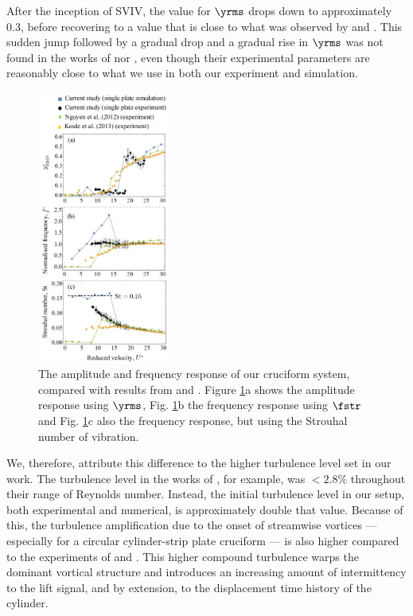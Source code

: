 \documentclass[a4paper,fleqn]{cas-sc}
\begin{document}
After the inception of SVIV, the value for  $\yrms$ drops down to approximately 0.3, before recovering to a value that is close to what was observed by \citet{Nguyen2012} and \citet{Koide2013}. This sudden jump followed by a gradual drop and a gradual rise in  $\yrms$ was not found in the works of \citet{Nguyen2012} nor \citet{Koide2013}, even though their experimental parameters are reasonably close to what we use in both our experiment and simulation.


\begin{figure}
  \centering
  \includegraphics[width=0.4\textwidth]{figs/figure10}
  \caption{The amplitude and frequency response of our cruciform system, compared with results from \citet{Nguyen2012} and \citet{Koide2013}. Figure \ref{fig:ampFreqComp}a shows the amplitude response using $\yrms$, Fig. \ref{fig:ampFreqComp}b the frequency response using $\fstr$ and Fig. \ref{fig:ampFreqComp}c also the frequency response, but using the Strouhal number of vibration.} \label{fig:ampFreqComp}
\end{figure}

We, therefore, attribute this difference to the higher turbulence level set in our work. The turbulence level in the works of \citet{Nguyen2012}, for example, was  $<2.8\%$ throughout their range of Reynolds number. Instead, the initial turbulence level in our setup, both experimental and numerical, is approximately double that value. Because of this, the turbulence amplification due to the onset of streamwise vortices  \citep{Zhao2018a} --- especially for a circular cylinder-strip plate cruciform \citep{Koide2017} --- is also higher compared to the experiments of \citet{Nguyen2012} and \citet{Koide2013}. This higher compound turbulence warps the dominant vortical structure and introduces an increasing amount of intermittency to the lift signal, and by extension, to the displacement time history of the cylinder.
\end{document}
